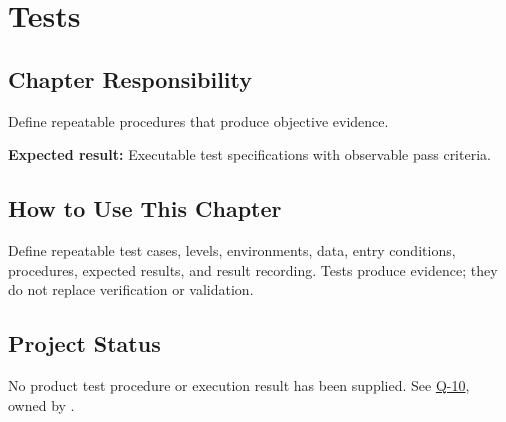 \chapter{Tests}
\section{Chapter Responsibility}
\label{Section:TestsResponsibility}
Define repeatable procedures that produce objective evidence.

\noindent\textbf{Expected result:} Executable test specifications with observable pass criteria.

\section{How to Use This Chapter}
Define repeatable test cases, levels, environments, data, entry conditions, procedures, expected results, and result recording. Tests produce evidence; they do not replace verification or validation.

\section{Project Status}
No product test procedure or execution result has been supplied.
See \hyperref[Question:Q-10]{Q-10}, owned by \DocumentOwner.
